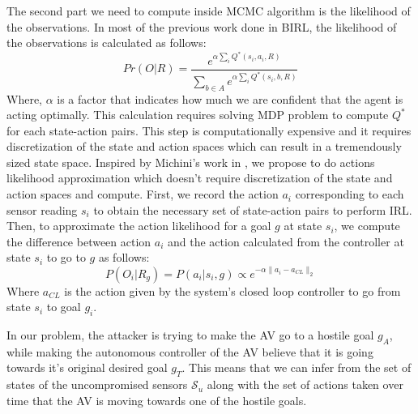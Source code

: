 \documentclass[conference]{IEEEtran}
\begin{document}
The second part we need to compute inside MCMC algorithm is the likelihood of the observations.
In most of the previous work done in BIRL, the likelihood of the observations is calculated as follows:
\begin{equation}
Pr(O|R) = \frac{e^{\alpha\sum_{i}{Q^*(s_i,a_i,R)}}}{\sum_{b\in A}{}e^{\alpha\sum_{i}{}Q^*(s_i,b,R)}}
\end{equation}
Where, $\alpha$ is a factor that indicates how much we are confident that the agent is acting optimally. This calculation requires solving MDP problem to compute $Q^*$ for each state-action pairs. This step is computationally expensive and it requires discretization of the state and action spaces which can result in a tremendously sized state space. Inspired by Michini's work in \cite{Michini2013}, we propose to do actions likelihood approximation which doesn't require discretization of the state and action spaces and compute. First, we record the action $a_i$ corresponding to each sensor reading $s_i$ to obtain the necessary set of state-action pairs to perform IRL. Then, to approximate the action likelihood for a goal $g$ at state $s_i$, we compute the difference between action $a_i$ and the action calculated from the controller at state $s_i$ to go to $g$ as follows:
\begin{equation}
P(O_i|R_{g}) = P(a_i|s_i,g) \propto e^{-\alpha \lVert a_i - a_{CL} \rVert_{2}}
\end{equation}
Where $a_{CL}$ is the action given by the system's closed loop controller to go from state $s_i$ to goal $g_i$.

In our problem, the attacker is trying to make the AV go to a hostile goal $g_A$, while making the autonomous controller of the AV believe that it is going towards it's original desired goal $g_T$. This means that we can infer from the set of states of the uncompromised sensors $\mathcal{S}_u$ along with the set of actions taken over time that the AV is moving towards one of the hostile goals.
\end{document}
